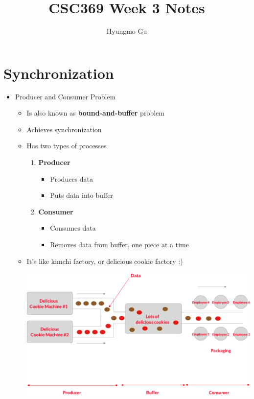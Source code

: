 \documentclass[12pt]{article}
\begin{document}
\title{CSC369 Week 3 Notes}
\author{Hyungmo Gu}
\maketitle

\bigskip

\section{Synchronization}

\bigskip
\begin{itemize}
    \item Producer and Consumer Problem
    \begin{itemize}
        \item Is also known as \textbf{bound-and-buffer} problem
        \item Achieves synchronization
        \item Has two types of processes
        \begin{enumerate}[1.]
            \item \textbf{Producer}
            \begin{itemize}
                \item Produces data
                \item Puts data into buffer
            \end{itemize}
            \item \textbf{Consumer}
            \begin{itemize}
                \item Consumes data
                \item Removes data from buffer, one piece at a time
            \end{itemize}
        \end{enumerate}
        \item It's like kimchi factory, or delicious cookie factory :)

        \begin{center}
        \includegraphics[width=\linewidth]{images/week_3_notes_1_1.png}
        \end{center}
    \end{itemize}
\end{itemize}

\bigskip
\end{document}

